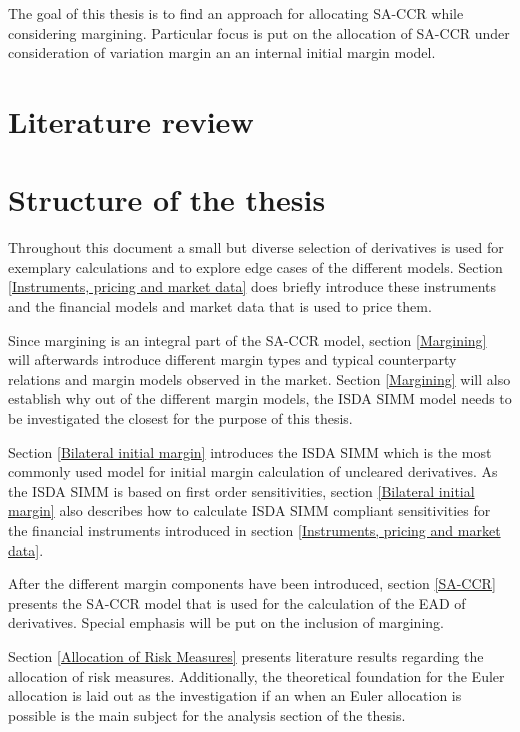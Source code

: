 \documentclass[../Thesis_AHoecherl.tex]{subfiles}
\begin{document}
    The goal of this thesis is to find an approach for allocating SA-CCR while considering margining. Particular focus is put on the allocation of SA-CCR under consideration of variation margin an an internal initial margin model. 
    
    \section{Literature review}


    \section{Structure of the thesis}

    Throughout this document a small but diverse selection of derivatives is used for exemplary calculations and to explore edge cases of the different models. Section \ref{Instruments, pricing and market data} does briefly introduce these instruments and the financial models and market data that is used to price them.
    
    Since margining is an integral part of the \gls{SA-CCR} model, section \ref{Margining} will afterwards introduce different margin types and typical counterparty relations and margin models observed in the market. Section \ref{Margining} will also establish why out of the different margin models, the \gls{ISDA SIMM} model needs to be investigated the closest for the purpose of this thesis.

    Section \ref{Bilateral initial margin} introduces the ISDA SIMM which is the most commonly used model for initial margin calculation of uncleared derivatives. As the ISDA SIMM is based on first order sensitivities, section \ref{Bilateral initial margin} also describes how to calculate \gls{ISDA SIMM} compliant sensitivities for the financial instruments introduced in section \ref{Instruments, pricing and market data}.

    After the different margin components have been introduced, section \ref{SA-CCR} presents the SA-CCR model that is used for the calculation of the \gls{EAD} of derivatives. Special emphasis will be put on the inclusion of margining.

    Section \ref{Allocation of Risk Measures} presents literature results regarding the allocation of risk measures. Additionally, the theoretical foundation for the Euler allocation is laid out as the investigation if an when an Euler allocation is possible is the main subject for the analysis section of the thesis.
\end{document}

